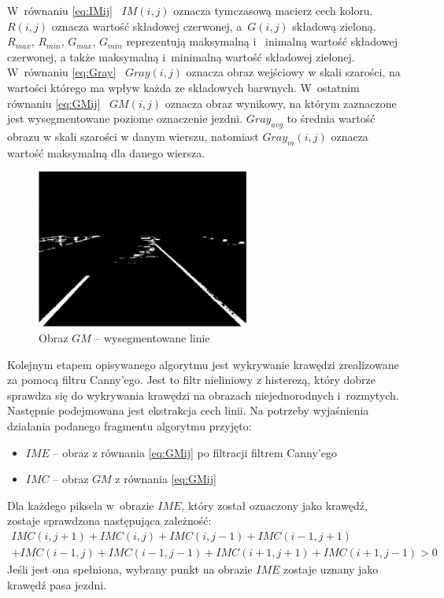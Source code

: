 W~równaniu \eqref{eq:IMij} \ ${IM(i,j)}$ oznacza tymczasową macierz cech koloru. ${R(i,j)}$ oznacza wartość składowej czerwonej, a~${G(i,j)}$ składową zieloną. 
${R_{max}}$, ${R_{min}}$, ${G_{max}}$, ${G_{min}}$ reprezentują maksymalną i ~inimalną wartość składowej czerwonej, a także maksymalną i~minimalną wartość składowej zielonej. 
W~równaniu \eqref{eq:Gray} \ $ Gray(i,j)$ oznacza obraz wejściowy w skali szarości, na wartości którego ma wpływ każda ze składowych barwnych. 
W~ostatnim równaniu \eqref{eq:GMij} \ $GM(i,j)$ oznacza obraz wynikowy, na którym zaznaczone jest wysegmentowane poziome oznaczenie jezdni. 
$Gray_{avg}$ to średnia wartość obrazu w skali szarości w danym wierszu, natomiast $Gray_{m}(i,j)$ oznacza wartość maksymalną dla danego wiersza.

\begin{figure}
  \centering
  \includegraphics[width=7cm]{img/segmentacja.png}
  \caption{Obraz $GM$ -- wysegmentowane linie\cite{T3}}
  \label{fig:segmented}
\end{figure}


Kolejnym etapem opisywanego algorytmu jest wykrywanie krawędzi zrealizowane za pomocą filtru Canny'ego. 
Jest to filtr nieliniowy z histerezą, który dobrze sprawdza się do wykrywania krawędzi na obrazach niejednorodnych i~rozmytych. 
Następnie podejmowana jest ekstrakcja cech linii. 
Na potrzeby wyjaśnienia działania podanego fragmentu algorytmu przyjęto:
\begin{itemize}
\item $IME$ -- obraz z równania \eqref{eq:GMij} po filtracji filtrem Canny'ego
\item $IMC$ -- obraz $GM$ z równania \eqref{eq:GMij}
\end{itemize}

Dla każdego piksela w~obrazie $IME$, który został oznaczony jako krawędź, zostaje sprawdzona następująca zależność:
\begin{equation}
	\begin{matrix}
	IMC(i,j+1)+IMC(i,j)+IMC(i,j-1)+IMC(i-1,j+1)\\
	+IMC(i-1,j)+IMC(i-1,j-1)+IMC(i+1,j+1)+IMC(i+1,j-1)>0
	\end{matrix}
\end{equation}
Jeśli jest ona spełniona, wybrany punkt na obrazie $IME$ zostaje uznany jako krawędź pasa jezdni.

